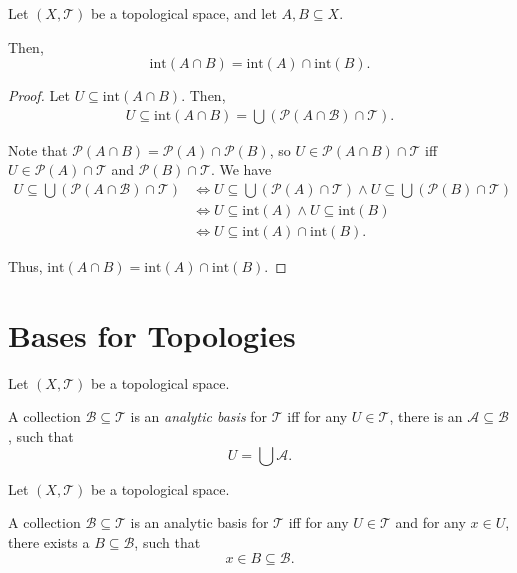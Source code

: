 \documentclass{report}
\begin{document}
\begin{lemma}
	Let $(X, \mathcal T)$ be a topological space, and let $A, B \subseteq X$.
	
	Then,
	$$
	\mathrm{int}(A \cap B) = \mathrm{int}(A) \cap \mathrm{int}(B).
	$$
	
	\begin{proof}
		Let $U \subseteq \mathrm{int}(A \cap B)$. Then,
		$$
		\begin{aligned}
			U \subseteq \mathrm{int}(A \cap B) = \bigcup (\mathcal P(A \cap \mathcal B) \cap \mathcal T).
		\end{aligned}
		$$
		
		Note that $\mathcal P(A \cap B) = \mathcal P(A) \cap \mathcal P(B)$, so $U \in \mathcal P(A \cap B) \cap \mathcal T$ iff $U \in \mathcal P(A) \cap \mathcal T$ and $\mathcal P(B) \cap \mathcal T$. We have
		$$
		\begin{aligned}
			U \subseteq \bigcup (\mathcal P(A \cap \mathcal B) \cap \mathcal T) &\iff U \subseteq \bigcup (\mathcal P(A) \cap \mathcal T) \land U \subseteq \bigcup (\mathcal P(B) \cap \mathcal T) \\
			&\iff U \subseteq \mathrm{int}(A) \land U \subseteq \mathrm{int}(B) \\
			&\iff U \subseteq \mathrm{int}(A) \cap \mathrm{int}(B).
		\end{aligned}
		$$
		
		Thus, $\mathrm{int}(A \cap B) = \mathrm{int}(A) \cap \mathrm{int}(B)$.
	\end{proof}
\end{lemma}



\section{Bases for Topologies}


\begin{definition}
	Let $(X, \mathcal T)$ be a topological space.
	
	A collection $\mathcal B \subseteq \mathcal T$ is an \textit{analytic basis} for $\mathcal T$ iff for any $U \in \mathcal T$, there is an $\mathcal A \subseteq \mathcal B$, such that
	$$
	U = \bigcup \mathcal A.
	$$
\end{definition}


\begin{lemma}
	Let $(X, \mathcal T)$ be a topological space.
	
	A collection $\mathcal B \subseteq \mathcal T$ is an analytic basis for $\mathcal T$ iff for any $U \in \mathcal T$ and for any $x \in U$, there exists a $B \subseteq \mathcal B$, such that
	$$
	x \in B \subseteq \mathcal B.
	$$
\end{lemma}
\end{document}
